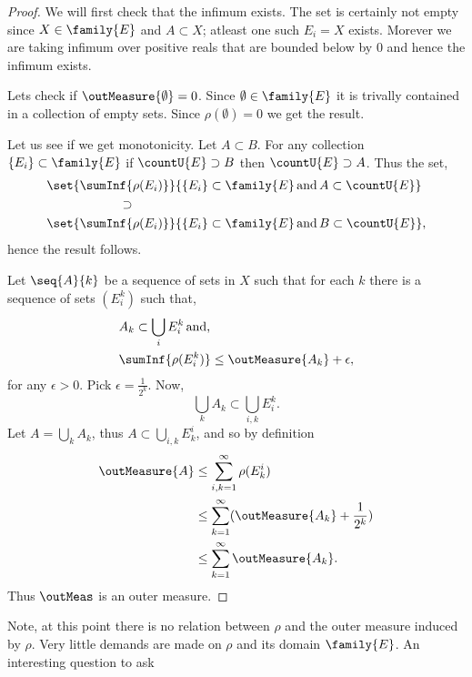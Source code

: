 \begin{proof}
    We will first check that the infimum exists. The set is certainly not empty since $X
    \in \family{E}$ and $A \subset X$; atleast one such $E_i = X$ exists. Morever we are taking
    infimum over positive reals that are bounded below by $0$ and hence the infimum exists.
    
    Lets check if $\outMeasure{\emptyset} = 0$. Since $\emptyset \in \family{E}$ it is trivally
    contained in a collection of empty sets. Since $\rho(\emptyset) = 0$ we get the result.

    Let us see if we get monotonicity. Let $A \subset B$. For any collection $\lbrace E_i \rbrace
    \subset \family{E}$ if $\countU{E} \supset {B}$ then $\countU{E} \supset {A}$. Thus the set,
    \begin{align*}
	&\set{\sumInf{\rho(E_i)}}{\lbrace E_i \rbrace \subset
	    \family{E}\,\text{and}\,A\subset\countU{E}}\\ 
	&\hspace{2cm}\supset \\
	&\set{\sumInf{\rho(E_i)}}{\lbrace E_i \rbrace \subset
	    \family{E}\,\text{and}\,B\subset\countU{E}},
    \end{align*}
    hence the result follows.

    Let $\seq{A}{k}$ be a sequence of sets in $X$ such that for each $k$ there is a sequence of
    sets $\left(E^k_i\right)$ such that,
    \begin{align*}
	&A_k \subset \bigcup\limits_{i}E^k_i \, \text{and,} \\
	&\sumInf{\rho(E^k_i)} \leq \outMeasure{A_k} + \epsilon,
    \end{align*}	
    for any $\epsilon > 0$. Pick $\epsilon = \frac{1}{2^k}$.
    Now,
    \[\bigcup\limits_{k}A_k \subset\bigcup\limits_{i,k}{E^k_i}.\]
    Let $A = \bigcup\limits_{k}A_k$, thus $A \subset \bigcup\limits_{i,k}E^i_k$, and so by definition
    \begin{align*}
	\outMeasure{A} &\leq \sum\limits_{i,k=1}^{\infty}\rho(E^i_k) \\
	&\leq \sum\limits_{k=1}^{\infty}(\outMeasure{A_k} + \frac{1}{2^k})\\
	&\leq \sum\limits_{k=1}^{\infty}\outMeasure{A_k}.
    \end{align*}
    Thus $\outMeas$ is an outer measure.
\end{proof}
Note, at this point there is no relation between $\rho$ and the outer measure induced by $\rho$.
Very little demands are made on $\rho$ and its domain $\family{E}$. An interesting question to ask
